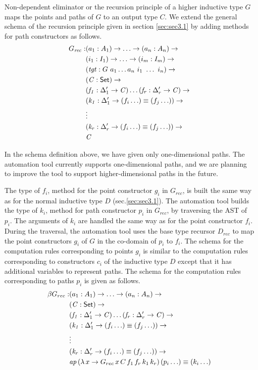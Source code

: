 \documentclass[sigplan,10pt]{acmart}
\begin{document}
Non-dependent eliminator or the recursion principle of a higher inductive type $G$ maps the points and paths of $G$ to an output type $C$. We extend the general schema of the recursion principle given in section \ref{sec:sec3.1} by adding methods for path constructors as follows.
\begin{align*}
G_{\mathit{rec}} : & (a_1 : A_1) \to \ldots \to (a_n : A_n) \to\\
& (i_1 : I_1) \to \ldots \to (i_m : I_m) \to\\
& (\mathit{tgt} : G\ a_1 \ldots a_n\ i_1\ \ldots\ i_n) \to\\
& (\mathit{C} : \textsf{Set}{}) \to \\
& (\mathit{f_1} : \Delta_1^\prime \to \mathit{C}) \ldots (\mathit{f_r} : \Delta_r^\prime \to \mathit{C}) \to \\
& (\mathit{k_1} : \Delta_1^\prime \to (f_i \ldots) \equiv (f_j \ldots)) \to \\
& \vdots \\
& (\mathit{k_r} : \Delta_r^\prime \to (f_i \ldots) \equiv (f_j \ldots)) \to \\
& \mathit{C}
\end{align*}
 
In the schema definition above, we have given only one-dimensional paths. The automation tool currently supports one-dimensional paths, and we are planning to improve the tool to support higher-dimensional paths in the future. 

The type of $f_i$, method for the point constructor $g_i$ in $G_{rec}$, is built the same way as for the normal inductive type $D$ (sec.\ref{sec:sec3.1}). The automation tool builds the type of $k_i$, method for path constructor $p_i$ in $G_{rec}$, by traversing the AST of $p_i$. The arguments of $k_i$ are handled the same way as for the point constructor $f_i$. During the traversal, the automation tool uses the base type recursor $D_{rec}$ to map the point constructors $g_i$ of $G$ in the co-domain of $p_i$ to $f_i$. The schema for the computation rules corresponding to points $g_i$ is similar to the computation rules corresponding to constructors $c_i$ of the inductive type $D$ except that it has additional variables to represent paths. The schema for the computation rules corresponding to paths $p_i$ is given as follows.
\begin{align*}
\beta G_{rec} :  & (a_1 : A_1) \to \ldots \to (a_n : A_n) \to\\
& (\mathit{C} : \textsf{Set}{}) \to \\
& (\mathit{f_1} : \Delta_1^\prime \to \mathit{C}) \ldots (\mathit{f_r} : \Delta_r^\prime \to \mathit{C}) \to \\
& (\mathit{k_1} : \Delta_1^\prime \to (f_i \ldots) \equiv (f_j \ldots)) \to \\
& \vdots \\
& (\mathit{k_r} : \Delta_r^\prime \to (f_i \ldots) \equiv (f_j \ldots)) \to \\
& \mathit{ap} \, (\lambda \, x \to G_{rec} \, x \, C \, f_1 \, f_r \, k_1 \, k_r) \, (p_i \ldots) \equiv (k_i \ldots)
\end{align*}
\end{document}
